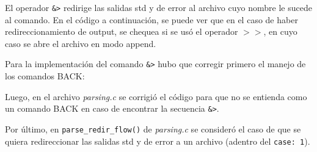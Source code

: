 \documentclass{article}
\begin{document}
El operador \texttt{\&\textgreater} redirige las salidas std y de error al archivo cuyo nombre le sucede al comando.
En el código a continuación, se puede ver que en el caso de haber redireccionamiento de output, se chequea si se usó el operador \texttt{$>>$}, en cuyo caso se abre el archivo en modo append.

Para la implementación del comando \texttt{\&\textgreater} hubo que corregir primero el manejo de los comandos BACK:

Luego, en el archivo \textit{parsing.c} se corrigió el código para que no se entienda como un comando BACK en caso de encontrar la secuencia \texttt{\&\textgreater}. 

Por último, en \texttt{parse\_redir\_flow()} de \textit{parsing.c} se consideró el caso de que se quiera redireccionar las salidas std y de error a un archivo (adentro del \texttt{case: 1}).
    
\end{document}
